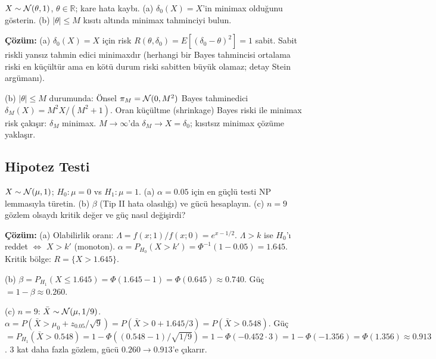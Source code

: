 \begin{ornek}
$X\sim\mathcal{N}(\theta,1)$, $\theta\in\mathbb{R}$; kare hata kaybı.
(a) $\delta_0(X)=X$'in minimax olduğunu gösterin.
(b) $|\theta|\leq M$ kısıtı altında minimax tahminciyi bulun.

\textbf{Çözüm:}
(a) $\delta_0(X)=X$ için risk $R(\theta,\delta_0)=E[(\delta_0-\theta)^2]=1$ sabit.
Sabit riskli yansız tahmin edici minimaxdır (herhangi bir Bayes tahmincisi ortalama riski en küçültür ama en kötü durum riski sabitten büyük olamaz; detay Stein argümanı).

(b) $|\theta|\leq M$ durumunda: Önsel $\pi_M=\mathcal{N}(0,M^2)$ Bayes tahminedici $\delta_M(X)=M^2X/(M^2+1)$. Oran küçültme (shrinkage) Bayes riski ile minimax risk çakışır: $\delta_M$ minimax.
$M\to\infty$'da $\delta_M\to X=\delta_0$; kısıtsız minimax çözüme yaklaşır.
\end{ornek}

\subsection{Hipotez Testi}

\begin{ornek}
$X\sim\mathcal{N}(\mu,1)$; $H_0:\mu=0$ vs $H_1:\mu=1$.
(a) $\alpha=0.05$ için en güçlü testi NP lemmasıyla türetin.
(b) $\beta$ (Tip II hata olasılığı) ve gücü hesaplayın.
(c) $n=9$ gözlem olsaydı kritik değer ve güç nasıl değişirdi?

\textbf{Çözüm:}
(a) Olabilirlik oranı: $\Lambda=f(x;1)/f(x;0)=e^{x-1/2}$. $\Lambda>k$ ise $H_0$'ı reddet $\iff$ $X>k'$ (monoton).
$\alpha=P_{H_0}(X>k')=\Phi^{-1}(1-0.05)=1.645$. Kritik bölge: $R=\{X>1.645\}$.

(b) $\beta=P_{H_1}(X\leq1.645)=\Phi(1.645-1)=\Phi(0.645)\approx0.740$.
Güç $=1-\beta\approx0.260$.

(c) $n=9$: $\bar X\sim\mathcal{N}(\mu,1/9)$. $\alpha=P(\bar X>\mu_0+z_{0.05}/\sqrt{9})=P(\bar X>0+1.645/3)=P(\bar X>0.548)$.
Güç $=P_{H_1}(\bar X>0.548)=1-\Phi((0.548-1)/\sqrt{1/9})=1-\Phi(-0.452\cdot3)=1-\Phi(-1.356)=\Phi(1.356)\approx0.913$.
3 kat daha fazla gözlem, gücü $0.260\to0.913$'e çıkarır.
\end{ornek}

